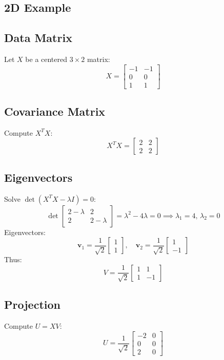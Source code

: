 \begin{notechapter}
\section{2D Example}
\subsection{Data Matrix}
Let \( X \) be a centered \( 3 \times 2 \) matrix:
\[
  X = \begin{bmatrix}
    -1 & -1 \\
    0 & 0 \\
    1 & 1
  \end{bmatrix}
\]

\subsection{Covariance Matrix}
Compute \( X^T X \):
\[
  X^T X = \begin{bmatrix}
    2 & 2 \\
    2 & 2
  \end{bmatrix}
\]

\subsection{Eigenvectors}
Solve \( \det(X^T X - \lambda I) = 0 \):
\[
  \det\begin{bmatrix}
    2 - \lambda & 2 \\
    2 & 2 - \lambda
  \end{bmatrix} = \lambda^2 - 4\lambda = 0 \implies \lambda_1 = 4, \, \lambda_2 = 0
\]
Eigenvectors:
\[
  \bm{v}_1 = \frac{1}{\sqrt{2}}\begin{bmatrix} 1 \\ 1 \end{bmatrix},
  \quad
  \bm{v}_2 = \frac{1}{\sqrt{2}}\begin{bmatrix} 1 \\ -1 \end{bmatrix}
\]
Thus:
\[
  V = \frac{1}{\sqrt{2}}\begin{bmatrix}
    1 & 1 \\
    1 & -1
  \end{bmatrix}
\]

\subsection{Projection}
Compute \( U = XV \):
\[
  U = \frac{1}{\sqrt{2}}\begin{bmatrix}
    -2 & 0 \\
    0 & 0 \\
    2 & 0
  \end{bmatrix}
\]


\end{notechapter}
